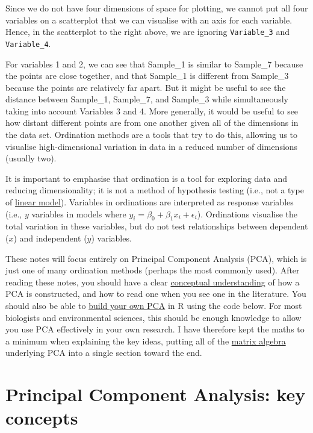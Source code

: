 \documentclass[]{article}
\begin{document}
Since we do not have four dimensions of space for plotting, we cannot
put all four variables on a scatterplot that we can visualise with an
axis for each variable. Hence, in the scatterplot to the right above, we
are ignoring \texttt{Variable\_3} and \texttt{Variable\_4}.

For variables 1 and 2, we can see that Sample\_1 is similar to Sample\_7
because the points are close together, and that Sample\_1 is different
from Sample\_3 because the points are relatively far apart. But it might
be useful to see the distance between Sample\_1, Sample\_7, and
Sample\_3 while simultaneously taking into account Variables 3 and 4.
More generally, it would be useful to see how distant different points
are from one another given all of the dimensions in the data set.
Ordination methods are a tools that try to do this, allowing us to
visualise high-dimensional variation in data in a reduced number of
dimensions (usually two).

It is important to emphasise that ordination is a tool for exploring
data and reducing dimensionality; it is not a method of hypothesis
testing (i.e., not a type of
\href{https://stirlingcodingclub.github.io/linear_modelling/index.html}{linear
model}). Variables in ordinations are interpreted as response variables
(i.e., \(y\) variables in models where
\(y_{i} = \beta_{0} + \beta_{1}x_{i} + \epsilon_{i}\)). Ordinations
visualise the total variation in these variables, but do not test
relationships between dependent (\(x\)) and independent (\(y\))
variables.

These notes will focus entirely on Principal Component Analysis (PCA),
which is just one of many ordination methods (perhaps the most commonly
used). After reading these notes, you should have a clear
\protect\hyperlink{pca}{conceptual understanding} of how a PCA is
constructed, and how to read one when you see one in the literature. You
should also be able to \protect\hyperlink{Rcode}{build your own PCA} in
R using the code below. For most biologists and environmental sciences,
this should be enough knowledge to allow you use PCA effectively in your
own research. I have therefore kept the maths to a minimum when
explaining the key ideas, putting all of the
\protect\hyperlink{maths}{matrix algebra} underlying PCA into a single
section toward the end.

\hypertarget{principal-component-analysis-key-concepts}{%
\section{Principal Component Analysis: key
concepts}\label{principal-component-analysis-key-concepts}}
\end{document}
